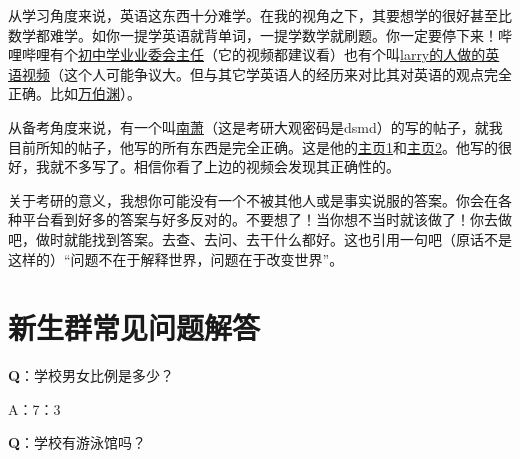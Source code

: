 \documentclass[12pt]{article} %
\begin{document}
	从学习角度来说，英语这东西十分难学。在我的视角之下，其要想学的很好甚至比数学都难学。如你一提学英语就背单词，一提学数学就刷题。你一定要停下来！哔哩哔哩有个\href{https://space.bilibili.com/531692757?spm_id_from=333.1387.follow.user_card.click}{初中学业业委会主任}（它的视频都建议看）也有个叫\href{https://www.bilibili.com/video/BV12z4y1h7NW/?spm_id_from=333.1387.favlist.content.click&vd_source=8efd693ea27794583cc06bda19111bd9}{larry的人做的英语视频}（这个人可能争议大。但与其它学英语人的经历来对比其对英语的观点完全正确。比如\href{https://space.bilibili.com/1274633472?spm_id_from=333.337.0.0}{万伯渊}）。

	从备考角度来说，有一个叫\href{https://www.yuque.com/lizhixin-brsto/mr0at9?\#}{南萧}（这是考研大观密码是dsmd）的写的帖子，就我目前所知的帖子，他写的所有东西是完全正确。这是他的\href{https://space.bilibili.com/116251406?spm_id_from=333.337.0.0}{主页1}和\href{https://space.bilibili.com/3546884394191531/upload/video}{主页2}。他写的很好，我就不多写了。相信你看了上边的视频会发现其正确性的。

	关于考研的意义，我想你可能没有一个不被其他人或是事实说服的答案。你会在各种平台看到好多的答案与好多反对的。不要想了！当你想不当时就该做了！你去做吧，做时就能找到答案。去查、去问、去干什么都好。这也引用一句吧（原话不是这样的）``问题不在于解释世界，问题在于改变世界''。



	
		\newpage



\section{新生群常见问题解答} 
\textbf{Q}：学校男女比例是多少？

A：7：3

\textbf{Q}：学校有游泳馆吗？
\end{document}
